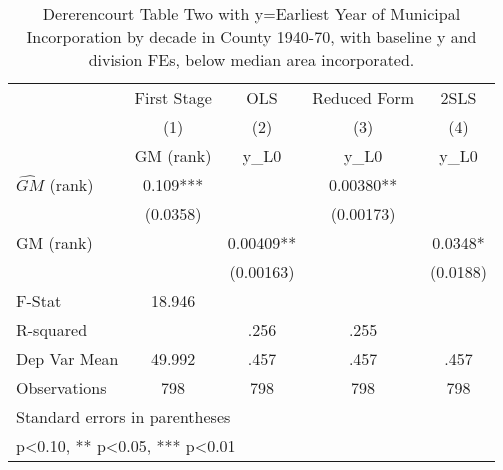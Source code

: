 \begin{table}[htbp]\centering
\def\sym#1{\ifmmode^{#1}\else\(^{#1}\)\fi}
\caption{Dererencourt Table Two with y=Earliest Year of Municipal Incorporation by decade in County 1940-70, with baseline y and division FEs, below median area incorporated.}
\begin{tabular}{l*{4}{c}}
\toprule
                    & First Stage   &         OLS   &Reduced Form   &        2SLS   \\
                    &\multicolumn{1}{c}{(1)}&\multicolumn{1}{c}{(2)}&\multicolumn{1}{c}{(3)}&\multicolumn{1}{c}{(4)}\\
                    &\multicolumn{1}{c}{GM  (rank)}&\multicolumn{1}{c}{y\_L0}&\multicolumn{1}{c}{y\_L0}&\multicolumn{1}{c}{y\_L0}\\
\midrule
$\hat{GM}$ (rank)   &       0.109***&               &     0.00380** &               \\
                    &    (0.0358)   &               &   (0.00173)   &               \\
\addlinespace
GM  (rank)          &               &     0.00409** &               &      0.0348*  \\
                    &               &   (0.00163)   &               &    (0.0188)   \\
\midrule
F-Stat              &      18.946   &               &               &               \\
R-squared           &               &        .256   &        .255   &               \\
Dep Var Mean        &      49.992   &        .457   &        .457   &        .457   \\
Observations        &         798   &         798   &         798   &         798   \\
\bottomrule
\multicolumn{5}{l}{\footnotesize Standard errors in parentheses}\\
\multicolumn{5}{l}{\footnotesize * p<0.10, ** p<0.05, *** p<0.01}\\
\end{tabular}
\end{table}
